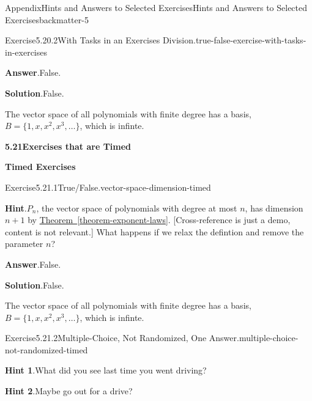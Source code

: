 \documentclass[oneside,10pt,]{book}
\newcommand{\blocktitlefont}{\relax}
\newcommand{\xreffont}{\relax}
\numberwithin{equation}{section}
\begin{document}
\begin{solutions-chapter}{Appendix}{Hints and Answers to Selected Exercises}{}{Hints and Answers to Selected Exercises}{}{}{backmatter-5}
\begin{divisionsolution}{Exercise}{5.20.2}{With Tasks in an Exercises Division.}{true-false-exercise-with-tasks-in-exercises}
\begin{enumerate}[font=\bfseries,label=(\alph*),ref=\alph*]
\par\smallskip%
\noindent\textbf{\blocktitlefont Answer}.\hypertarget{true-false-task-in-exercises-5-back}{}\quad{}False.%
\par\smallskip%
\noindent\textbf{\blocktitlefont Solution}.\hypertarget{true-false-task-in-exercises-6-back}{}\quad{}False.%
\par
The vector space of all polynomials with finite degree has a basis, \(B = \{1,x,x^2,x^3,\dots\}\), which is infinte.%
\end{enumerate}%
\end{divisionsolution}%
\par\medskip
\noindent\textbf{\Large{}5.21\space\textperiodcentered\space{}Exercises that are Timed}
\par\medskip
\noindent\textbf{\large{}\textperiodcentered\space{}Timed Exercises}
\begin{divisionsolution}{Exercise}{5.21.1}{True\slash{}False.}{vector-space-dimension-timed}%
\par\smallskip%
\noindent\textbf{\blocktitlefont Hint}.\hypertarget{vector-space-dimension-timed-4-back}{}\quad{}\(P_n\), the vector space of polynomials with degree at most \(n\), has dimension \(n+1\) by \hyperref[theorem-exponent-laws]{Theorem~{\xreffont\ref{theorem-exponent-laws}}}.  [Cross-reference is just a demo, content is not relevant.]  What happens if we relax the defintion and remove the parameter \(n\)?%
\par\smallskip%
\noindent\textbf{\blocktitlefont Answer}.\hypertarget{vector-space-dimension-timed-5-back}{}\quad{}False.%
\par\smallskip%
\noindent\textbf{\blocktitlefont Solution}.\hypertarget{vector-space-dimension-timed-6-back}{}\quad{}False.%
\par
The vector space of all polynomials with finite degree has a basis, \(B = \{1,x,x^2,x^3,\dots\}\), which is infinte.%
\end{divisionsolution}%
\begin{divisionsolution}{Exercise}{5.21.2}{Multiple-Choice, Not Randomized, One Answer.}{multiple-choice-not-randomized-timed}%
\par\smallskip%
\noindent\textbf{\blocktitlefont Hint 1}.\hypertarget{multiple-choice-not-randomized-timed-4-back}{}\quad{}What did you see last time you went driving?%
\par\smallskip%
\noindent\textbf{\blocktitlefont Hint 2}.\hypertarget{multiple-choice-not-randomized-timed-5-back}{}\quad{}Maybe go out for a drive?%
\par\smallskip%

\end{divisionsolution}
\end{solutions-chapter}
\end{document}

